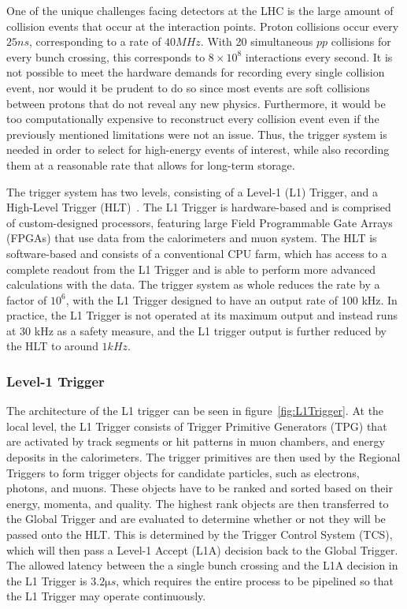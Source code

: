 One of the unique challenges facing detectors at the LHC is the large amount of collision events that occur at the interaction points.
Proton collisions occur every $25\unit{ns}$, corresponding to a rate of $40\unit{MHz}$.
With 20 simultaneous $pp$ collisions for every bunch crossing, this corresponds to $8\times10^8$ interactions every second.
It is not possible to meet the hardware demands for recording every single collision event, nor would it be prudent to do so since most events are soft collisions between protons that do not reveal any new physics.
Furthermore, it would be too computationally expensive to reconstruct every collision event even if the previously mentioned limitations were not an issue.
Thus, the trigger system is needed in order to select for high-energy events of interest, while also recording them at a reasonable rate that allows for long-term storage.

The trigger system has two levels, consisting of a Level-1 (L1) Trigger, and a High-Level Trigger (HLT)~\cite{CMStrigger}.
The L1 Trigger is hardware-based and is comprised of custom-designed processors, featuring large Field Programmable Gate Arrays (FPGAs) that use data from the calorimeters and muon system.
The HLT is software-based and consists of a conventional CPU farm, which has access to a complete readout from the L1 Trigger and is able to perform more advanced calculations with the data.
The trigger system as whole reduces the rate by a factor of $10^6$, with the L1 Trigger designed to have an output rate of 100 kHz.
In practice, the L1 Trigger is not operated at its maximum output and instead runs at 30 kHz as a safety measure, and the L1 trigger output is further reduced by the HLT to around $1\unit{kHz}$.

\subsubsection{Level-1 Trigger}

The architecture of the L1 trigger can be seen in figure~\ref{fig:L1Trigger}.
At the local level, the L1 Trigger consists of Trigger Primitive Generators (TPG) that are activated by track segments or hit patterns in muon chambers, and energy deposits in the calorimeters.
The trigger primitives are then used by the Regional Triggers to form trigger objects for candidate particles, such as electrons, photons, and muons.
These objects have to be ranked and sorted based on their energy, momenta, and quality.
The highest rank objects are then transferred to the Global Trigger and are evaluated to determine whether or not they will be passed onto the HLT.
This is determined by the Trigger Control System (TCS), which will then pass a Level-1 Accept (L1A) decision back to the Global Trigger.
The allowed latency between the a single bunch crossing and the L1A decision in the L1 Trigger is $3.2\unit{\micro s}$, which requires the entire process to be pipelined so that the L1 Trigger may operate continuously.

